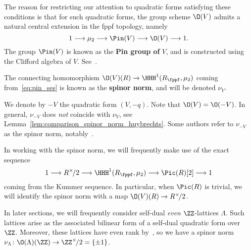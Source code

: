 The reason for restricting our attention to quadratic forms satisfying these conditions is that for such quadratic forms, the group scheme $\O(V)$ admits a natural central extension in the fppf topology, namely
\begin{equation}\label{eq:pin_ses}
1 \longrightarrow \mu_2 \longrightarrow \Pin(V) \longrightarrow \O(V) \longrightarrow 1.
\end{equation}
The group $\Pin(V)$ is known as the {\bfseries Pin group of} $V$, and is constructed using the Clifford algebra of $V$. See~\cite[Appendix C.5]{ConradReductive}.

\begin{definition}\label{def:spinor_norm}
The connecting homomorphism $\O(V)(R) \rightarrow \HHH^1(R_{\fppf},\mu_2)$ coming from~\eqref{eq:pin_ses} is known as the {\bfseries spinor norm}, and will be denoted $\nu_V$. 
\end{definition}


\begin{remark}
We denote by $-V$ the quadratic form $(V,-q)$. Note that $\O(V) = \O(-V)$. In general, $\nu_{-V}$ does \emph{not} coincide with $\nu_V$, see Lemma~\ref{lem:comparison_spinor_norm_huybrechts}. Some authors refer to $\nu_{-V}$ as the spinor norm, notably~\cite{HuybrechtsK3}.
\end{remark}

\begin{remark}
In working with the spinor norm, we will frequently make use of the exact sequence
$$
1 \longrightarrow R^{\times}\!/2 \longrightarrow \HHH^1(R_{\fppf},\mu_2) \longrightarrow \Pic(R)[2] \longrightarrow 1
$$
    coming from the Kummer sequence. In particular, when $\Pic(R)$ is trivial, we will identify the spinor norm with a map $\O(V)(R) \rightarrow R^{\times}\!/2$.
\end{remark}
%
%

\begin{example}
    In later sections, we will frequently consider self-dual \emph{even} $\ZZ$-lattices $\Lambda$. Such lattices arise as the associated bilinear form of a self-dual quadratic form over $\ZZ$. Moreover, these lattices have even rank by~\cite[Theorem~14.1.1]{HuybrechtsK3}, so we have a spinor norm $\nu_{\Lambda}\colon \O(\Lambda)(\ZZ) \rightarrow \ZZ^{\times}\!/2 = \{\pm 1\}$.
\end{example}

